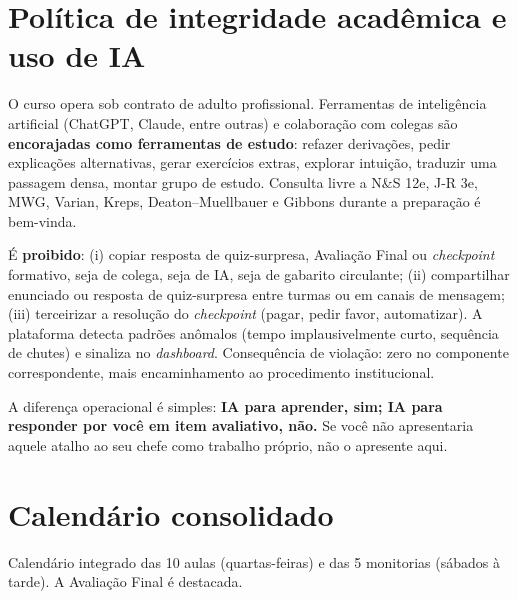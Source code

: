\documentclass[11pt,a4paper]{article}
\newcommand{\ns}{N\&S 12e}
\newcommand{\jr}{J-R 3e}
\newcommand{\mwg}{MWG}
\begin{document}
\section{Política de integridade acadêmica e uso de IA}
\label{sec:integridade}

O curso opera sob contrato de adulto profissional. Ferramentas de inteligência artificial (ChatGPT, Claude, entre outras) e colaboração com colegas são \textbf{encorajadas como ferramentas de estudo}: refazer derivações, pedir explicações alternativas, gerar exercícios extras, explorar intuição, traduzir uma passagem densa, montar grupo de estudo. Consulta livre a \ns{}, \jr{}, \mwg{}, Varian, Kreps, Deaton--Muellbauer e Gibbons durante a preparação é bem-vinda.

É \textbf{proibido}: (i) copiar resposta de quiz-surpresa, Avaliação Final ou \textit{checkpoint} formativo, seja de colega, seja de IA, seja de gabarito circulante; (ii) compartilhar enunciado ou resposta de quiz-surpresa entre turmas ou em canais de mensagem; (iii) terceirizar a resolução do \textit{checkpoint} (pagar, pedir favor, automatizar). A plataforma detecta padrões anômalos (tempo implausivelmente curto, sequência de chutes) e sinaliza no \textit{dashboard}. Consequência de violação: zero no componente correspondente, mais encaminhamento ao procedimento institucional.

A diferença operacional é simples: \textbf{IA para aprender, sim; IA para responder por você em item avaliativo, não.} Se você não apresentaria aquele atalho ao seu chefe como trabalho próprio, não o apresente aqui.

\section{Calendário consolidado}

Calendário integrado das 10 aulas (quartas-feiras) e das 5 monitorias (sábados à tarde). A Avaliação Final é destacada.
\end{document}
